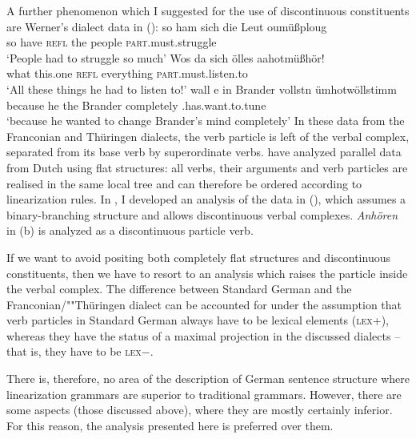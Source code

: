 A further phenomenon which I suggested for the use of discontinuous constituents are 
Werner's dialect data \citep[, 355]{Werner94a} in ():
\eal
\label{bsp-sonneberg-partikel-modal}
\ex{}
\gll so ham  sich die Leut  oumüßploug\label{bsp-abmussplagen}\\
    so have  \textsc{refl} the people \textsc{part}.must.struggle\\
\glt `People had to struggle so much'
\ex{}
\gll Wos  da       sich          ölles       aahotmüßhör!\\
     what this.one \textsc{refl} everything  \textsc{part}.must.listen.to\\
\glt `All these things he had to listen to!'
\ex
\gll wall    e  in  Brander vollstn    ümhotwöllstimm\\
    because he the Brander completely \partic.has.want.to.tune\\
\glt `because he wanted to change Brander's mind completely'
\zl
In these data from the Franconian and Thüringen dialects, the verb particle is left of
the verbal complex, separated from its base verb by superordinate verbs. \citet{BvN98a} have analyzed
parallel data from Dutch using flat structures: all verbs, their arguments and verb particles are 
realised in the same local tree and can therefore be ordered according to linearization rules. In
, I developed an analysis of the data in (), which assumes a binary-branching
structure and allows discontinuous verbal complexes. \emph{Anhören} in (b) is analyzed as a discontinuous 
particle verb.

If we want to avoid positing both completely flat structures and discontinuous constituents,
then we have to resort to an analysis which raises the particle inside the verbal complex.
The difference between Standard German and the Franconian/""Thüringen dialect can be accounted
for under the assumption that verb particles in Standard German always have to be lexical
elements (\textsc{lex}+), whereas they have the status of a maximal projection in the discussed
dialects -- that is, they have to be \textsc{lex}$-$.

There is, therefore, no area of the description of German sentence structure where linearization
grammars are superior to traditional grammars. However, there are some aspects (those discussed above), 
where they are mostly certainly inferior. For this reason, the analysis presented here is preferred
over them. 



